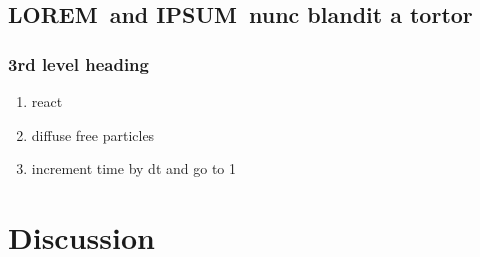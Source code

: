 \documentclass[10pt,letterpaper]{article}
\newlength\savedwidth
\newcommand\thickhline{\noalign{\global\savedwidth\arrayrulewidth\global\arrayrulewidth 2pt}%
\hline
\noalign{\global\arrayrulewidth\savedwidth}}
\newcommand{\lorem}{{\bf LOREM}}
\newcommand{\ipsum}{{\bf IPSUM}}
\begin{document}

\subsection*{\lorem\ and \ipsum\ nunc blandit a tortor}
\subsubsection*{3rd level heading} 
 

\begin{enumerate}
	\item{react}
	\item{diffuse free particles}
	\item{increment time by dt and go to 1}
\end{enumerate}


\section*{Discussion}
\end{document}
